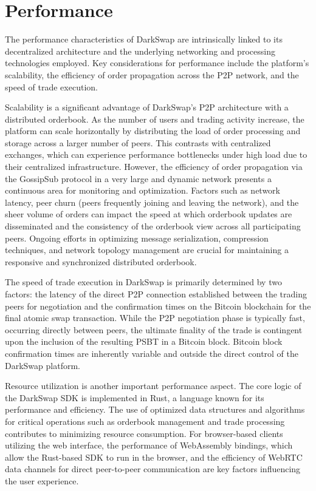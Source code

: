 \documentclass{article}
\begin{document}
\section{Performance}
The performance characteristics of DarkSwap are intrinsically linked to its decentralized architecture and the underlying networking and processing technologies employed. Key considerations for performance include the platform's scalability, the efficiency of order propagation across the P2P network, and the speed of trade execution.

Scalability is a significant advantage of DarkSwap's P2P architecture with a distributed orderbook. As the number of users and trading activity increase, the platform can scale horizontally by distributing the load of order processing and storage across a larger number of peers. This contrasts with centralized exchanges, which can experience performance bottlenecks under high load due to their centralized infrastructure. However, the efficiency of order propagation via the GossipSub protocol in a very large and dynamic network presents a continuous area for monitoring and optimization. Factors such as network latency, peer churn (peers frequently joining and leaving the network), and the sheer volume of orders can impact the speed at which orderbook updates are disseminated and the consistency of the orderbook view across all participating peers. Ongoing efforts in optimizing message serialization, compression techniques, and network topology management are crucial for maintaining a responsive and synchronized distributed orderbook.

The speed of trade execution in DarkSwap is primarily determined by two factors: the latency of the direct P2P connection established between the trading peers for negotiation and the confirmation times on the Bitcoin blockchain for the final atomic swap transaction. While the P2P negotiation phase is typically fast, occurring directly between peers, the ultimate finality of the trade is contingent upon the inclusion of the resulting PSBT in a Bitcoin block. Bitcoin block confirmation times are inherently variable and outside the direct control of the DarkSwap platform.

Resource utilization is another important performance aspect. The core logic of the DarkSwap SDK is implemented in Rust, a language known for its performance and efficiency. The use of optimized data structures and algorithms for critical operations such as orderbook management and trade processing contributes to minimizing resource consumption. For browser-based clients utilizing the web interface, the performance of WebAssembly bindings, which allow the Rust-based SDK to run in the browser, and the efficiency of WebRTC data channels for direct peer-to-peer communication are key factors influencing the user experience.
\end{document}

